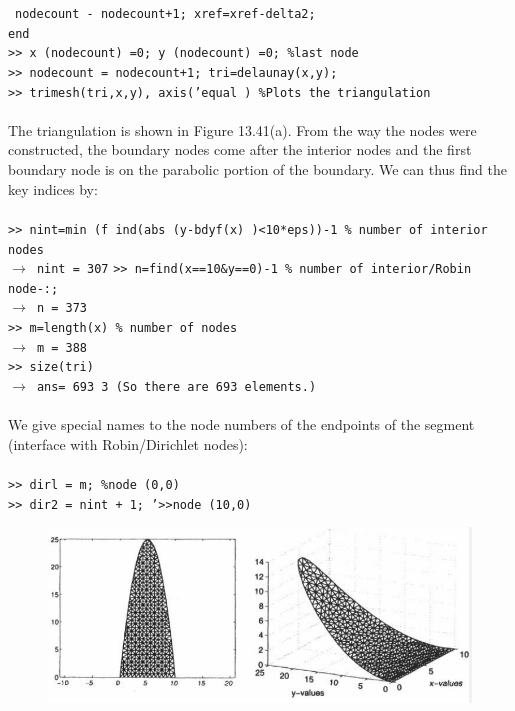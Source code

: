 \documentclass[../main.tex]{subfiles}
\begin{document}
~\texttt{nodecount - nodecount+1; xref=xref-delta2; }\\
\texttt{end}\\
\texttt{>> x (nodecount) =0; y (nodecount) =0; \%last node}\\
\texttt{>> nodecount = nodecount+1; tri=delaunay(x,y); }\\
\texttt{>> trimesh(tri,x,y), axis('equal ) \%Plots the triangulation }
\\
\\
The triangulation is shown in Figure 13.41(a). From the way the nodes were 
constructed, the boundary nodes come after the interior nodes and the first 
boundary node is on the parabolic portion of the boundary. We can thus find the 
key indices by: 
\\
\\
\texttt{>> nint=min (f ind(abs (y-bdyf(x) )<10*eps))-1 \% number of interior nodes}\\
\texttt{$\rightarrow$ nint = 307}
\texttt{>> n=find(x==10\&y==0)-1 \% number of interior/Robin node-:;}\\
\texttt{$\rightarrow$ n = 373}\\
\texttt{>> m=length(x) \% number of nodes }\\
\texttt{$\rightarrow$ m = 388}\\
\texttt{>> size(tri)}\\
\texttt{$\rightarrow$ ans= 693 3 (So there are 693 elements.) }
\\
\\
We give special names to the node numbers of the endpoints of the segment 
(interface with Robin/Dirichlet nodes):
\\
\\
\texttt{>> dirl = m; \%node (0,0)} \\
\texttt{>> dir2 = nint + 1; '>>node (10,0)}\\
\begin{figure}[H]
\includegraphics[width=0.9\linewidth]{28}
	\centering
	\label{pfig:ch13_28}
\end{figure}
\end{document}
